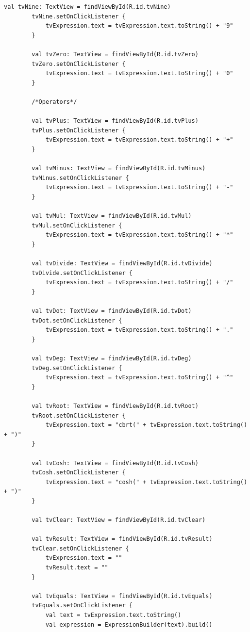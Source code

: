 \documentclass[a4paper, 14pt]{extarticle}
\begin{document}
\begin{lstlisting}[language={},caption={Калькулятор на Kotlin},label={lst:code1}]
        val tvNine: TextView = findViewById(R.id.tvNine)
        tvNine.setOnClickListener {
            tvExpression.text = tvExpression.text.toString() + "9"
        }

        val tvZero: TextView = findViewById(R.id.tvZero)
        tvZero.setOnClickListener {
            tvExpression.text = tvExpression.text.toString() + "0"
        }

        /*Operators*/

        val tvPlus: TextView = findViewById(R.id.tvPlus)
        tvPlus.setOnClickListener {
            tvExpression.text = tvExpression.text.toString() + "+"
        }

        val tvMinus: TextView = findViewById(R.id.tvMinus)
        tvMinus.setOnClickListener {
            tvExpression.text = tvExpression.text.toString() + "-"
        }

        val tvMul: TextView = findViewById(R.id.tvMul)
        tvMul.setOnClickListener {
            tvExpression.text = tvExpression.text.toString() + "*"
        }

        val tvDivide: TextView = findViewById(R.id.tvDivide)
        tvDivide.setOnClickListener {
            tvExpression.text = tvExpression.text.toString() + "/"
        }

        val tvDot: TextView = findViewById(R.id.tvDot)
        tvDot.setOnClickListener {
            tvExpression.text = tvExpression.text.toString() + "."
        }

        val tvDeg: TextView = findViewById(R.id.tvDeg)
        tvDeg.setOnClickListener {
            tvExpression.text = tvExpression.text.toString() + "^"
        }

        val tvRoot: TextView = findViewById(R.id.tvRoot)
        tvRoot.setOnClickListener {
            tvExpression.text = "cbrt(" + tvExpression.text.toString() + ")"
        }

        val tvCosh: TextView = findViewById(R.id.tvCosh)
        tvCosh.setOnClickListener {
            tvExpression.text = "cosh(" + tvExpression.text.toString() + ")"
        }

        val tvClear: TextView = findViewById(R.id.tvClear)

        val tvResult: TextView = findViewById(R.id.tvResult)
        tvClear.setOnClickListener {
            tvExpression.text = ""
            tvResult.text = ""
        }

        val tvEquals: TextView = findViewById(R.id.tvEquals)
        tvEquals.setOnClickListener {
            val text = tvExpression.text.toString()
            val expression = ExpressionBuilder(text).build()


\end{lstlisting}
\end{document}

